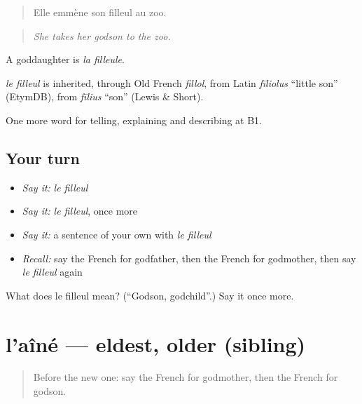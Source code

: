 \begin{quote}
Elle emmène son filleul au zoo.
\end{quote}

\begin{quote}
\emph{She takes her godson to the zoo.}
\end{quote}

A goddaughter is \emph{la filleule}.

\begin{cousinweb}
\emph{le filleul} is inherited, through Old French \emph{fillol}, from Latin \emph{fīliolus} \textquotedblleft{}little son\textquotedblright{} (EtymDB), from \emph{fīlius} \textquotedblleft{}son\textquotedblright{} (Lewis \& Short).
\end{cousinweb}

\begin{grammarlens}[title={What you've built}]
One more word for telling, explaining and describing at B1.
\end{grammarlens}

\subsection*{Your turn}
\begin{itemize}
\raggedright
  \item \emph{Say it:} \emph{le filleul}
  \item \emph{Say it:} \emph{le filleul}, once more
  \item \emph{Say it:} a sentence of your own with \emph{le filleul}
  \item \emph{Recall:} say the French for godfather, then the French for godmother, then say \emph{le filleul} again
\end{itemize}

\begin{tcolorbox}[breakable,colback=teal!4,colframe=teal!35!black,title={Before you move on}]
What does le filleul mean? (\textquotedblleft{}Godson, godchild\textquotedblright{}.) Say it once more.
\end{tcolorbox}
\section[l'aîné]{l'aîné — eldest, older (sibling)}

\label{lesson:FR-C490-aine}



\begin{quote}
Before the new one: say the French for godmother, then the French for godson.
\end{quote}

